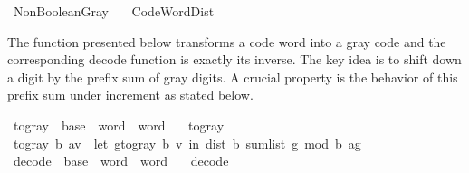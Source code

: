 %
\begin{isabellebody}%
%
%
\isadelimdocument
%
\endisadelimdocument
%
\isatagdocument
%
\isamarkuptrue%
%
\endisatagdocument
{\isafolddocument}%
%
\isadelimdocument
%
\endisadelimdocument
%
\isadelimtheory
%
\endisadelimtheory
%
\isatagtheory
{}\isamarkupfalse%
\ Non{\isacharunderscore}{\kern0pt}Boolean{\isacharunderscore}{\kern0pt}Gray\isanewline
\ \ \ Code{\isacharunderscore}{\kern0pt}Word{\isacharunderscore}{\kern0pt}Dist\isanewline
{}%
\endisatagtheory
{\isafoldtheory}%
%
\isadelimtheory
%
\endisadelimtheory
%
\begin{isamarkuptext}%
The function presented below transforms a code word into a gray code
  and the corresponding decode function is exactly its inverse.
The key idea is to shift down a digit by the prefix sum of gray digits.
A crucial property is the behavior of this prefix sum under increment
  as stated below.%
\end{isamarkuptext}\isamarkuptrue%
\isamarkupfalse%
\ to{\isacharunderscore}{\kern0pt}gray\ {\isacharcolon}{\kern0pt}{\isacharcolon}{\kern0pt}\ {\isachardoublequoteopen}base\ {\isasymRightarrow}\ word\ {\isasymRightarrow}\ word{\isachardoublequoteclose}\ \isanewline
\ \ {\isachardoublequoteopen}to{\isacharunderscore}{\kern0pt}gray\ {\isacharunderscore}{\kern0pt}\ {\isacharbrackleft}{\kern0pt}{\isacharbrackright}{\kern0pt}\ {\isacharequal}{\kern0pt}\ {\isacharbrackleft}{\kern0pt}{\isacharbrackright}{\kern0pt}{\isachardoublequoteclose}\isanewline
{\isacharbar}{\kern0pt}\ {\isachardoublequoteopen}to{\isacharunderscore}{\kern0pt}gray\ b\ {\isacharparenleft}{\kern0pt}a{\isacharhash}{\kern0pt}v{\isacharparenright}{\kern0pt}\ {\isacharequal}{\kern0pt}\ {\isacharparenleft}{\kern0pt}let\ g{\isacharequal}{\kern0pt}to{\isacharunderscore}{\kern0pt}gray\ b\ v\ in\ dist{}\ b\ {\isacharparenleft}{\kern0pt}sum{\isacharunderscore}{\kern0pt}list\ g\ mod\ b{\isacharparenright}{\kern0pt}\ a{\isacharhash}{\kern0pt}g{\isacharparenright}{\kern0pt}{\isachardoublequoteclose}\isanewline
\isanewline
{}\isamarkupfalse%
\ decode\ {\isacharcolon}{\kern0pt}{\isacharcolon}{\kern0pt}\ {\isachardoublequoteopen}base\ {\isasymRightarrow}\ word\ {\isasymRightarrow}\ word{\isachardoublequoteclose}\ \isanewline
\ \ {\isachardoublequoteopen}decode\ {\isacharunderscore}{\kern0pt}\ {\isacharbrackleft}{\kern0pt}{\isacharbrackright}{\kern0pt}\ {\isacharequal}{\kern0pt}\ {\isacharbrackleft}{\kern0pt}{\isacharbrackright}{\kern0pt}{\isachardoublequoteclose}\isanewline

\end{isabellebody}
